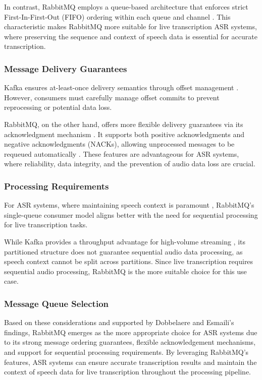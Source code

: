 In contrast, RabbitMQ employs a queue-based architecture that enforces strict First-In-First-Out (FIFO) ordering within each queue and channel \cite{kafka_v_rabbitmq}. This characteristic makes RabbitMQ more suitable for live transcription ASR systems, where preserving the sequence and context of speech data is essential for accurate transcription.

\subsubsection{Message Delivery Guarantees} Kafka ensures at-least-once delivery semantics through offset management \cite{kafka_v_rabbitmq}. However, consumers must carefully manage offset commits to prevent reprocessing or potential data loss.

RabbitMQ, on the other hand, offers more flexible delivery guarantees via its acknowledgment mechanism \cite{kafka_v_rabbitmq}. It supports both positive acknowledgments and negative acknowledgments (NACKs), allowing unprocessed messages to be requeued automatically \cite{rabbitmq_nack}. These features are advantageous for ASR systems, where reliability, data integrity, and the prevention of audio data loss are crucial.

\subsubsection{Processing Requirements}
For ASR systems, where maintaining speech context is paramount \cite{speech_context}, RabbitMQ's single-queue consumer model aligns better with the need for sequential processing for live transcription tasks.

While Kafka provides a throughput advantage for high-volume streaming \cite{kafka_v_rabbitmq}, its partitioned structure does not guarantee sequential audio data processing, as speech context cannot be split across partitions. Since live transcription requires sequential audio processing, RabbitMQ is the more suitable choice for this use case.

\subsubsection{Message Queue Selection} \label{subsection:research_gap}
Based on these considerations and supported by Dobbelaere and Esmaili's \cite{kafka_v_rabbitmq} findings, RabbitMQ emerges as the more appropriate choice for ASR systems due to its strong message ordering guarantees, flexible acknowledgement mechanisms, and support for sequential processing requirements. By leveraging RabbitMQ's features, ASR systems can ensure accurate transcription results and maintain the context of speech data for live transcription throughout the processing pipeline.


